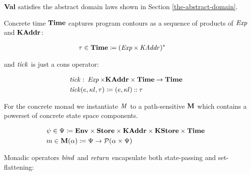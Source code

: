 \begin{proposition} $ \mathtt{\mathbf{Val}} $ satisfies the abstract domain
laws shown in Section \ref{the-abstract-domain}. \end{proposition}

\par

Concrete time $ \mathtt{\mathbf{Time}} $ captures program contours as a
sequence of products of $ \operatorname{\mathit{Exp}} $ and $ \mathtt{\mathbf{KAddr}} $:

\small\begin{align*}
&\hspace{0em}  \tau   \in   \mathtt{\mathbf{Time}}   \coloneqq   (\operatorname{\mathit{Exp}}   \times   \operatorname{\mathit{KAddr}})  ^{ * } 
\end{align*}\normalsize

and $ \operatorname{\mathit{tick}} $ is just a cons operator:

\small\begin{align*}
&\hspace{0em}  \operatorname{\mathit{tick}}   \mathbin{\colon}   \operatorname{\mathit{Exp}}   \times   \mathtt{\mathbf{KAddr}}   \times   \mathtt{\mathbf{Time}}   \rightarrow   \mathtt{\mathbf{Time}}  \\
&\hspace{0em}  \operatorname{\mathit{tick}}  (e, \kappa l, \tau )  \coloneqq  (e, \kappa l) \mathbin{::}  \tau 
\end{align*}\normalsize

\par

For the concrete monad we instantiate $ \operatorname{\mathit{M}} $ to a path-sensitive
$ \mathtt{\mathbf{M}} $ which contains a powerset of concrete state space
components.

\small\begin{align*}
&\hspace{0em}  \psi   \in   \Psi   \coloneqq   \mathtt{\mathbf{Env}}   \times   \mathtt{\mathbf{Store}}   \times   \mathtt{\mathbf{KAddr}}   \times   \mathtt{\mathbf{KStore}}   \times   \mathtt{\mathbf{Time}}  \\
&\hspace{0em} m  \in   \mathtt{\mathbf{M}}(  \alpha )  \coloneqq   \Psi   \rightarrow   \mathcal{P} ( \alpha   \times   \Psi )
\end{align*}\normalsize

Monadic operators $ \operatorname{\mathit{bind}} $ and $ \operatorname{\mathit{return}} $ encapsulate both
state-passing and set-flattening:

